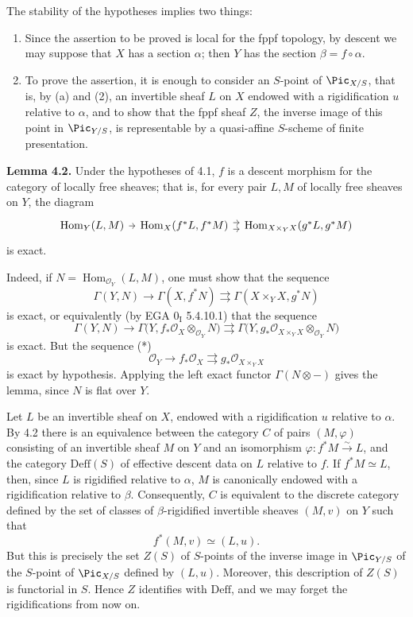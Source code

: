 The stability of the hypotheses implies two things:
\begin{enumerate}[label=\alph*.]
\item Since the assertion to be proved is local for the fppf topology, by
  descent we may suppose that $X$ has a section $\alpha$; then $Y$ has the
  section $\beta=f\circ\alpha$.
\item To prove the assertion, it is enough to consider an $S$-point of
  $\Pic_{X/S}$, that is, by (a) and (2), an invertible sheaf $L$ on $X$
  endowed with a rigidification $u$ relative to $\alpha$, and to show that
  the fppf sheaf $Z$, the inverse image of this point in $\Pic_{Y/S}$, is
  representable by a quasi-affine $S$-scheme of finite presentation.
\end{enumerate}

\textbf{Lemma 4.2.} Under the hypotheses of 4.1, $f$ is a descent morphism
for the category of locally free sheaves; that is, for every pair $L,M$ of
locally free sheaves on $Y$, the diagram
\[
\begin{tikzcd}[column sep=tiny]
\operatorname{Hom}_Y(L,M) \arrow[r] &
  \operatorname{Hom}_X(f^*L,f^*M)
    \arrow[r,shift left=.7ex] \arrow[r,shift right=.7ex] &
  \operatorname{Hom}_{X\times_YX}(g^*L,g^*M)
\end{tikzcd}
\]
is exact.

Indeed, if $N=\operatorname{Hom}_{\mathcal O_Y}(L,M)$, one must show that the sequence
\[
  \Gamma(Y,N)\longrightarrow\Gamma(X,f^*N)
  \rightrightarrows\Gamma(X\times_YX,g^*N)
\]
is exact, or equivalently (by EGA $0_{\mathrm I}$ 5.4.10.1) that the sequence
\[
  \Gamma(Y,N)
  \longrightarrow
  \Gamma\bigl(Y,f_*\mathcal O_X\otimes_{\mathcal O_Y}N\bigr)
  \rightrightarrows
  \Gamma\bigl(Y,g_*\mathcal O_{X\times_YX}
    \otimes_{\mathcal O_Y}N\bigr)
\]
is exact. But the sequence (*)
\[
  \mathcal O_Y\longrightarrow f_*\mathcal O_X
  \rightrightarrows g_*\mathcal O_{X\times_YX}
\]
is exact by hypothesis. Applying the left exact functor
$\Gamma(N\otimes -)$ gives the lemma, since $N$ is flat over $Y$.

Let $L$ be an invertible sheaf on $X$, endowed with a rigidification $u$
relative to $\alpha$. By 4.2 there is an equivalence between the category
$C$ of pairs $(M,\varphi)$ consisting of an invertible sheaf $M$ on $Y$ and
an isomorphism $\varphi:f^*M\xrightarrow{\sim}L$, and the category
$\mathrm{Deff}(S)$ of effective descent data on $L$ relative to $f$.
If $f^*M\simeq L$, then, since $L$ is rigidified relative to $\alpha$, $M$
is canonically endowed with a rigidification relative to $\beta$.
Consequently, $C$ is equivalent to the discrete category defined by the set
of classes of $\beta$-rigidified invertible sheaves $(M,v)$ on $Y$ such that
\[
  f^*(M,v)\simeq(L,u).
\]
But this is precisely the set $Z(S)$ of $S$-points of the inverse image in
$\Pic_{Y/S}$ of the $S$-point of $\Pic_{X/S}$ defined by $(L,u)$. Moreover,
this description of $Z(S)$ is functorial in $S$. Hence $Z$ identifies with
$\mathrm{Deff}$, and we may forget the rigidifications from now on.

